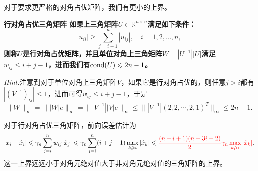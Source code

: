 \documentclass[a4paper,10pt]{ctexart}
\begin{document}
对于要求更严格的对角占优矩阵，我们有更小的上界。
\begin{lemma}\label{lem:DiagDom}\bf{\textup{行对角占优三角矩阵}}
    如果上三角矩阵$ U\in \mathbb{R}^{n\times n} $满足如下条件：
    \begin{equation}
        |u_{ii}| \geqslant \sum_{j=i+1}^{n} |u_{ij}|,\quad i=1,2,\ldots,n,
    \end{equation}
    则称$ U $是行对角占优矩阵，并且单位对角上三角矩阵$ W = |U^{-1}| |U| $满足$ w_{ij}\leqslant i+j-1 $，进而我们有$ {\rm cond}(U) \leqslant 2n-1 $。
\end{lemma}
\noindent \emph{Hint:}注意到对于单位对角上三角矩阵$ V $，如果它是行对角占优的，则任意$ j>i $都有$ |(V^{-1})_{ij}|\leqslant 1 $，进而可得$ w_{ij}\leqslant i+j-1 $，于是
\[
    \| W \|_\infty = \| |W|e \|_\infty = \| |V^{-1}| |V| e \|_\infty \leqslant \| |V^{-1}| (2,2,\cdots ,2,1)^T \|_\infty \leqslant 2n-1.
\]

对于行对角占优三角矩阵，前向误差估计为
\begin{equation}
    |x_i - \hat{x}_i| \leqslant \gamma_n \sum_{j=i}^{n} w_{ij} |\hat{x}_j| \leqslant \gamma_n \sum_{j=i}^{n} (i+j-1) \max_{k\geqslant i}|\hat{x}_k| \leqslant \textcolor{red}{\frac{(n-i+1)(n+3i-2)}{2}\gamma_n \max_{k\geqslant i}|\hat{x}_k|}.
\end{equation}
这一上界远远小于对角元绝对值大于非对角元绝对值的三角矩阵的上界。
\end{document}
